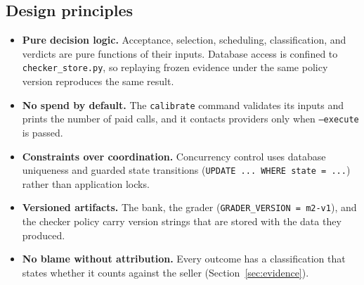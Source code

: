 \subsection{Design principles}
\label{sec:design_principles}

\begin{itemize}
  \item \textbf{Pure decision logic.} Acceptance, selection, scheduling,
    classification, and verdicts are pure functions of their inputs. Database
    access is confined to \texttt{checker\_store.py}, so replaying frozen
    evidence under the same policy version reproduces the same result.
  \item \textbf{No spend by default.} The \texttt{calibrate} command validates
    its inputs and prints the number of paid calls, and it contacts providers
    only when \texttt{--execute} is passed.
  \item \textbf{Constraints over coordination.} Concurrency control uses
    database uniqueness and guarded state transitions
    (\texttt{UPDATE ... WHERE state = ...}) rather than application locks.
  \item \textbf{Versioned artifacts.} The bank, the grader
    (\texttt{GRADER\_VERSION = m2-v1}), and the checker policy carry version
    strings that are stored with the data they produced.
  \item \textbf{No blame without attribution.} Every outcome has a
    classification that states whether it counts against the seller
    (Section~\ref{sec:evidence}).
\end{itemize}
